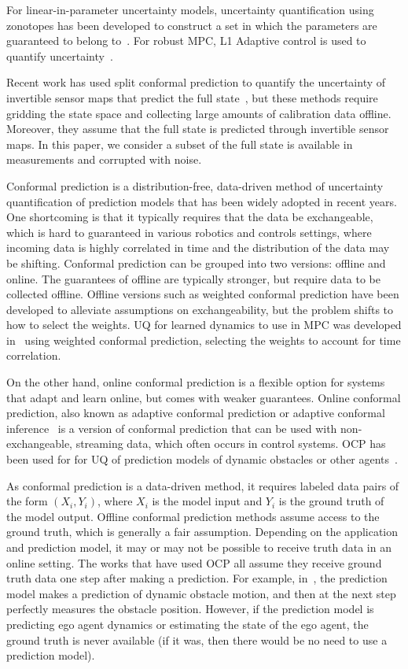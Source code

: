 \documentclass[letterpaper, 10 pt, conference]{ieeeconf}  %
\begin{document}
For linear-in-parameter uncertainty models, uncertainty quantification using zonotopes has been developed to construct a set in which the parameters are guaranteed to belong to~\cite{cohen2024uncertainty}. For robust MPC, L1 Adaptive control is used to quantify uncertainty~\cite{tao2024robust}.

Recent work has used split conformal prediction to quantify the uncertainty of invertible sensor maps that predict the full state~\cite{yang2023safe,zhang2025conformal}, but these methods require gridding the state space and collecting large amounts of calibration data offline. Moreover, they assume that the full state is predicted through invertible sensor maps. In this paper, we consider a subset of the full state is available in measurements and corrupted with noise.

Conformal prediction is a distribution-free, data-driven method of uncertainty quantification of prediction models that has been widely adopted in recent years. One shortcoming is that it typically requires that the data be exchangeable, which is hard to guaranteed in various robotics and controls settings, where incoming data is highly correlated in time and the distribution of the data may be shifting. Conformal prediction can be grouped into two versions: offline and online. The guarantees of offline are typically stronger, but require data to be collected offline. Offline versions such as weighted conformal prediction have been developed to alleviate assumptions on exchangeability, but the problem shifts to how to select the weights. UQ for learned dynamics to use in MPC was developed in~\cite{chee2023uncertainty} using weighted conformal prediction, selecting the weights to account for time correlation.

On the other hand, online conformal prediction is a flexible option for systems that adapt and learn online, but comes with weaker guarantees. Online conformal prediction, also known as adaptive conformal prediction or adaptive conformal inference~\cite{gibbs2021adaptive, areces2025online} is a version of conformal prediction that can be used with non-exchangeable, streaming data, which often occurs in control systems. OCP has been used for for UQ of prediction models of dynamic obstacles or other agents~\cite{dixit2023adaptive, zhang2025safety}. 

As conformal prediction is a data-driven method, it requires labeled data pairs of the form $(X_i, Y_i)$, where $X_i$ is the model input and $Y_i$ is the ground truth of the model output. Offline conformal prediction methods  assume access to the ground truth, which is generally a fair assumption. Depending on the application and prediction model, it may or may not be possible to receive truth data in an online setting. The works that have used OCP all assume they receive ground truth data one step after making a prediction. For example, in~\cite{dixit2023adaptive}, the prediction model makes a prediction of dynamic obstacle motion, and then at the next step perfectly measures the obstacle position. However, if the prediction model is predicting ego agent dynamics or estimating the state of the ego agent, the ground truth is never available (if it was, then there would be no need to use a prediction model). 
\end{document}
